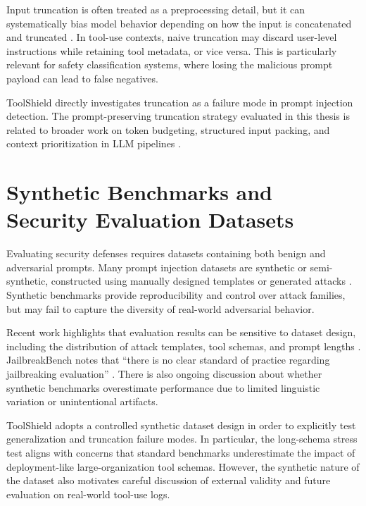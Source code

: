 Input truncation is often treated as a preprocessing detail, but it can systematically bias model behavior depending on how the input is concatenated and truncated \cite{truncation_bias}. In tool-use contexts, naive truncation may discard user-level instructions while retaining tool metadata, or vice versa. This is particularly relevant for safety classification systems, where losing the malicious prompt payload can lead to false negatives.

ToolShield directly investigates truncation as a failure mode in prompt injection detection. The prompt-preserving truncation strategy evaluated in this thesis is related to broader work on token budgeting, structured input packing, and context prioritization in LLM pipelines \cite{token_budgeting_methods}.

\section{Synthetic Benchmarks and Security Evaluation Datasets}
\label{subsec:rw_synthetic_benchmarks}

Evaluating security defenses requires datasets containing both benign and adversarial prompts. Many prompt injection datasets are synthetic or semi-synthetic, constructed using manually designed templates or generated attacks \cite{function_calling_risks}. Synthetic benchmarks provide reproducibility and control over attack families, but may fail to capture the diversity of real-world adversarial behavior.

Recent work highlights that evaluation results can be sensitive to dataset design, including the distribution of attack templates, tool schemas, and prompt lengths \cite{benchmark_limitations}. JailbreakBench notes that \enquote{there is no clear standard of practice regarding jailbreaking evaluation} \cite{benchmark_limitations}. There is also ongoing discussion about whether synthetic benchmarks overestimate performance due to limited linguistic variation or unintentional artifacts.

ToolShield adopts a controlled synthetic dataset design in order to explicitly test generalization and truncation failure modes. In particular, the long-schema stress test aligns with concerns that standard benchmarks underestimate the impact of deployment-like large-organization tool schemas. However, the synthetic nature of the dataset also motivates careful discussion of external validity and future evaluation on real-world tool-use logs.

